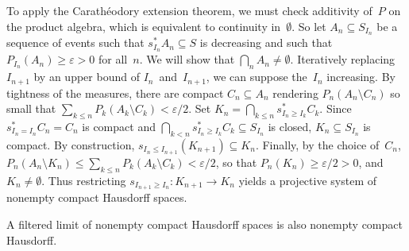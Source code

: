 To apply the Carathéodory extension theorem,
we must check \sig additivity of~$P$ on the product algebra,
which is equivalent to continuity in~$\emptyset$.
So let \( A_n \subseteq S_{I_n} \) be a sequence of events
such that \( s_{I_n}^* A_n \subseteq S \) is decreasing
and such that \( P_{I_n}(A_n) \ge \varepsilon > 0 \) for all~$n$.
We will show that \( \bigcap_n A_n \ne \emptyset \).
Iteratively replacing~$I_{n+1}$ by an upper bound of $I_n$~and~$I_{n+1}$,
we can suppose the~$I_n$ increasing.
By tightness of the measures, there are compact \( C_n \subseteq A_n \)
rendering \( P_n(A_n \setminus C_n) \) so small that
\( \sum_{k \le n} P_k(A_k \setminus C_k) < \varepsilon/2 \).
Set \( K_n = \bigcap_{k \le n} s_{I_n \ge I_k}^* C_k \).
Since \( s_{I_n = I_n}^* C_n = C_n \) is compact
and \( \bigcap_{k < n} s_{I_n \ge I_k}^* C_k \subseteq S_{I_n} \) is closed,
\( K_n \subseteq S_{I_n} \) is compact.
By construction, \( s_{I_n \le I_{n+1}}(K_{n+1}) \subseteq K_n \).
Finally, by the choice of~$C_n$,
\(	P_n( A_n \setminus K_n )
\le	\sum_{k \le n} P_k( A_k \setminus C_k )
<	\varepsilon/2
\), so that \( P_n(K_n) \ge \varepsilon/2 > 0 \),
and \( K_n \ne \emptyset \).
Thus restricting \( s_{I_{n+1} \ge I_n} \colon K_{n+1} \to K_n \)
yields a projective system of nonempty compact Hausdorff spaces.

\begin	{lemma}
A filtered limit of nonempty compact Hausdorff spaces
is also nonempty compact Hausdorff.
\end	{lemma}
